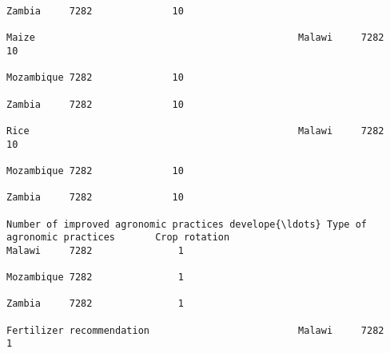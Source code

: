 \documentclass[11pt]{article}
\begin{document}
\begin{Verbatim}[commandchars=\\\{\}]
                                                                                                                                                                                                                 Zambia     7282              10  
                                                                                                                                                              Maize                                              Malawi     7282              10  
                                                                                                                                                                                                                 Mozambique 7282              10  
                                                                                                                                                                                                                 Zambia     7282              10  
                                                                                                                                                              Rice                                               Malawi     7282              10  
                                                                                                                                                                                                                 Mozambique 7282              10  
                                                                                                                                                                                                                 Zambia     7282              10  
                                                                         Number of improved agronomic practices develope{\ldots} Type of agronomic practices       Crop rotation                                      Malawi     7282               1  
                                                                                                                                                                                                                 Mozambique 7282               1  
                                                                                                                                                                                                                 Zambia     7282               1  
                                                                                                                                                              Fertilizer recommendation                          Malawi     7282               1  

\end{Verbatim}
\end{document}
